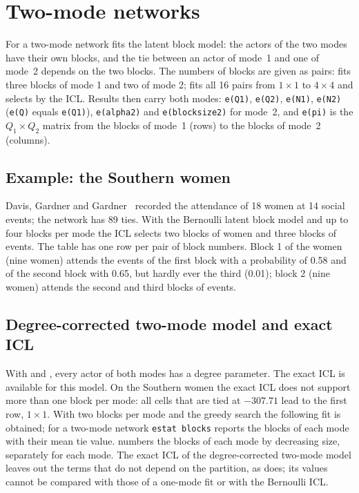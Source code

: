 \chapter{Two-mode networks}\label{ch:two}

For a two-mode network \nwsbm{} fits the latent block model: the actors of the two modes have their own blocks, and the tie between an actor of mode~1 and one of mode~2 depends on the two blocks. The numbers of blocks are given as pairs:  fits three blocks of mode 1 and two of mode 2;  fits all 16 pairs from $1\times1$ to $4\times4$ and selects by the ICL. Results then carry both modes: \texttt{e(Q1)}, \texttt{e(Q2)}, \texttt{e(N1)}, \texttt{e(N2)} (\texttt{e(Q)} equals \texttt{e(Q1)}), \texttt{e(alpha2)} and \texttt{e(blocksize2)} for mode~2, and \texttt{e(pi)} is the $Q_1\times Q_2$ matrix from the blocks of mode~1 (rows) to the blocks of mode~2 (columns).

\section{Example: the Southern women}
Davis, Gardner and Gardner~\cite{davis1941} recorded the attendance of 18 women at 14 social events; the network has 89 ties.
With the Bernoulli latent block model and up to four blocks per mode the ICL selects two blocks of women and three blocks of events.
The table has one row per pair of block numbers. Block 1 of the women (nine women) attends the events of the first block with a probability of 0.58 and of the second block with 0.65, but hardly ever the third (0.01); block 2 (nine women) attends the second and third blocks of events.

\section{Degree-corrected two-mode model and exact ICL}
With  and , every actor of both modes has a degree parameter. The exact ICL is available for this model. On the Southern women the exact ICL does not support more than one block per mode: all cells that are tied at $-307.71$ lead to the first row, $1\times1$. With two blocks per mode and the greedy search the following fit is obtained; for a two-mode network \texttt{estat blocks} reports the blocks of each mode with their mean tie value.
 numbers the blocks of each mode by decreasing size, separately for each mode. The exact ICL of the degree-corrected two-mode model leaves out the terms that do not depend on the partition, as \greed{} does; its values cannot be compared with those of a one-mode fit or with the Bernoulli ICL.
